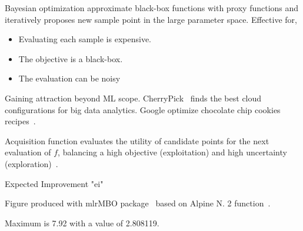 Bayesian optimization approximate black-box functions with proxy functions and
iteratively proposes new sample point in the large parameter space. Effective
for,

\begin{itemize}
\item Evaluating each sample is expensive.
\item The objective is a black-box.
\item The evaluation can be noisy
\end{itemize}

Gaining attraction beyond ML scope. CherryPick~\cite{alipourfard2017cherrypick}
finds the best cloud configurations for big data analytics. Google optimize
chocolate chip cookies recipes~\cite{solnik2017bayesian}.

Acquisition function evaluates the utility of candidate points for the next
evaluation of $f$, balancing a high objective (exploitation) and high
uncertainty (exploration)~\cite{shahriari2016taking}.

Expected Improvement "ei"

Figure produced with mlrMBO package~\cite{bischl2017mlrmbo} based on Alpine N. 2
function~\cite{clerc1999swarm}.

Maximum is 7.92 with a value of 2.808119.

